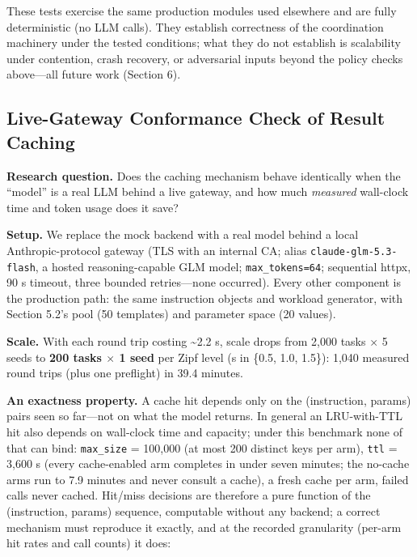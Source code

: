\documentclass[
  sigconf,
  anonymous]{acmart}
\newcounter{none} %
\begin{document}
These tests exercise the same production modules used elsewhere and are
fully deterministic (no LLM calls). They establish correctness of the
coordination machinery under the tested conditions; what they do not
establish is scalability under contention, crash recovery, or
adversarial inputs beyond the policy checks above---all future work
(Section 6).

\subsection{Live-Gateway Conformance Check of Result
Caching}\label{live-gateway-conformance-check-of-result-caching}

\textbf{Research question.} Does the caching mechanism behave
identically when the ``model'' is a real LLM behind a live gateway, and
how much \emph{measured} wall-clock time and token usage does it save?

\textbf{Setup.} We replace the mock backend with a real model behind a
local Anthropic-protocol gateway (TLS with an internal CA; alias
\texttt{claude-glm-5.3-flash}, a hosted reasoning-capable GLM model;
\texttt{max\_tokens=64}; sequential httpx, 90 s timeout, three bounded
retries---none occurred). Every other component is the production path:
the same instruction objects and workload generator, with Section 5.2's
pool (50 templates) and parameter space (20 values).

\textbf{Scale.} With each round trip costing \textasciitilde2.2 s, scale
drops from 2,000 tasks \(\times\) 5 seeds to \textbf{200 tasks
\(\times\) 1 seed} per Zipf level (s in \{0.5, 1.0, 1.5\}): 1,040
measured round trips (plus one preflight) in 39.4 minutes.

\textbf{An exactness property.} A cache hit depends only on the
(instruction, params) pairs seen so far---not on what the model returns.
In general an LRU-with-TTL hit also depends on wall-clock time and
capacity; under this benchmark none of that can bind: \texttt{max\_size}
= 100,000 (at most 200 distinct keys per arm), \texttt{ttl} = 3,600 s
(every cache-enabled arm completes in under seven minutes; the no-cache
arms run to 7.9 minutes and never consult a cache), a fresh cache per
arm, failed calls never cached. Hit/miss decisions are therefore a pure
function of the (instruction, params) sequence, computable without any
backend; a correct mechanism must reproduce it exactly, and at the
recorded granularity (per-arm hit rates and call counts) it does:
\end{document}
